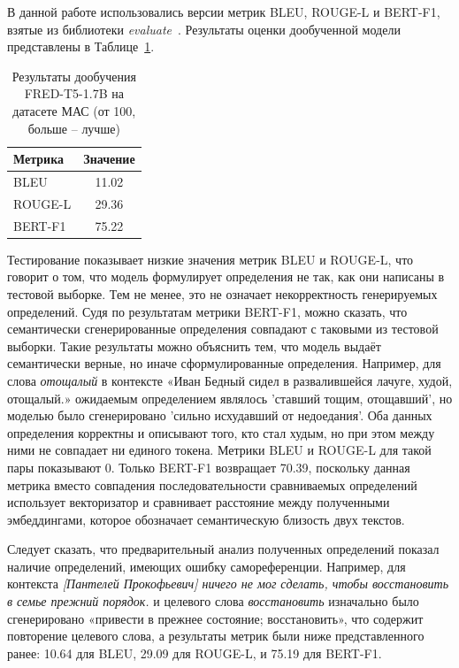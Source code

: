 \documentclass[LI,VKR]{HSEUniversity}
\begin{document}
В данной работе использовались версии метрик BLEU, ROUGE-L и BERT-F1, взятые из библиотеки \textit{evaluate}~.
Результаты оценки дообученной модели представлены в Таблице~\ref{tab:Similarity metrics}.

\begin{table}[H]
\centering
\caption{Результаты дообучения FRED-T5-1.7B на датасете МАС (от 100, больше – лучше)}
\label{tab:Similarity metrics}
\begin{tabular}{|l|c|}
\hline
Метрика                  & Значение \\
\hline
BLEU            & 11.02                  \\
\hline
ROUGE-L           & 29.36                  \\
\hline
BERT-F1          & 75.22                  \\
\hline
\end{tabular}
\end{table}

Тестирование показывает низкие значения метрик BLEU и ROUGE-L,
что говорит о том, что модель формулирует определения не так,
как они написаны в тестовой выборке.
Тем не менее, это не означает некорректность генерируемых определений.
Судя по результатам метрики BERT-F1, можно сказать, что семантически сгенерированные определения
совпадают с таковыми из тестовой выборки.
Такие результаты можно объяснить тем, что модель выдаёт семантически верные,
но иначе сформулированные определения.
Например, для слова \textit{отощалый} в контексте
«Иван Бедный сидел в развалившейся лачуге, худой, отощалый.»
ожидаемым определением являлось ’ставший тощим, отощавший’,
но моделью было сгенерировано ’сильно исхудавший от недоедания’.
Оба данных определения корректны и описывают того, кто стал худым,
но при этом между ними не совпадает ни единого токена.
Метрики BLEU и ROUGE-L для такой пары показывают 0.
Только BERT-F1 возвращает 70.39,
поскольку данная метрика вместо совпадения последовательности сравниваемых определений
использует векторизатор и сравнивает расстояние между полученными эмбеддингами,
которое обозначает семантическую близость двух текстов.

Следует сказать, что предварительный анализ полученных определений показал
наличие определений, имеющих ошибку самореференции.
Например, для контекста \textit{[Пантелей Прокофьевич] ничего не мог сделать, чтобы восстановить в семье прежний порядок.}
и целевого слова \textit{восстановить}
изначально было сгенерировано «привести в прежнее состояние; восстановить»,
что содержит повторение целевого слова,
а результаты метрик были ниже представленного ранее: 10.64 для BLEU, 29.09 для ROUGE-L, и 75.19 для BERT-F1.
\end{document}
